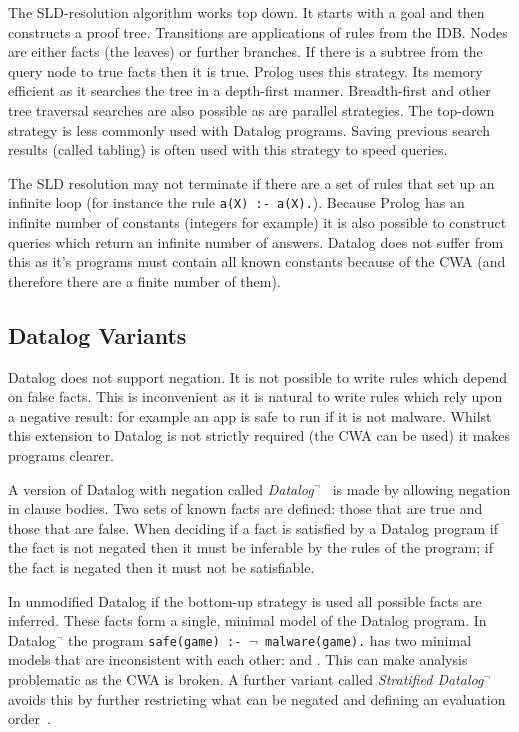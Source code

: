 \documentclass[thesis.tex]{subfiles}
\begin{document}
The SLD-resolution algorithm works top down. It starts with a goal and
then constructs a proof tree. Transitions are applications of rules
from the IDB. Nodes are either facts (the leaves) or further
branches. If there is a subtree from the query node to true facts then
it is true. Prolog uses this strategy. Its memory efficient as it
searches the tree in a depth-first manner. Breadth-first and other
tree traversal searches are also possible as are parallel
strategies. The top-down strategy is less commonly used with Datalog
programs. Saving previous search results (called tabling) is often
used with this strategy to speed queries.

The SLD resolution may not terminate if there are a set of rules that
set up an infinite loop (for instance the rule \lstinline!a(X) :- a(X).!).
Because Prolog has an infinite number of constants (integers
for example) it is also possible to construct queries which return an
infinite number of answers. Datalog does not suffer from this as it's
programs must contain all known constants because of the \ac{CWA} (and
therefore there are a finite number of them).


\subsection{Datalog Variants}

Datalog does not support negation. It is not possible to write
rules which depend on false facts.  This is inconvenient as it is
natural to write rules which rely upon a negative result: for example
an app is safe to run if it is not malware.  Whilst this extension to Datalog is
not strictly required (the \ac{CWA} can be used) it makes programs clearer.

A version of Datalog with negation called
\emph{Datalog$^\lnot$}~\cite{ceri_what_1989} is made by allowing negation in clause
bodies. Two sets of known facts are defined: those that are true and those that
are false.  When deciding if a fact is satisfied by a Datalog program if the
fact is not negated then it must be inferable by the rules of the program; if
the fact is negated then it must not be satisfiable.  

In unmodified Datalog if the bottom-up strategy
is used all possible facts are inferred. These facts form a single, minimal
model of the Datalog program.  In Datalog$^\lnot$ the program \texttt{safe(game)
:- $\mathsf\lnot$ malware(game).} has two minimal models that are inconsistent
with each other:  and .  This can make
analysis problematic as the \ac{CWA} is broken. A further variant called
\emph{Stratified Datalog$^\lnot$} avoids this by further restricting what can be
negated and defining an evaluation order~\cite{minker_foundations_2014}.
\end{document}
